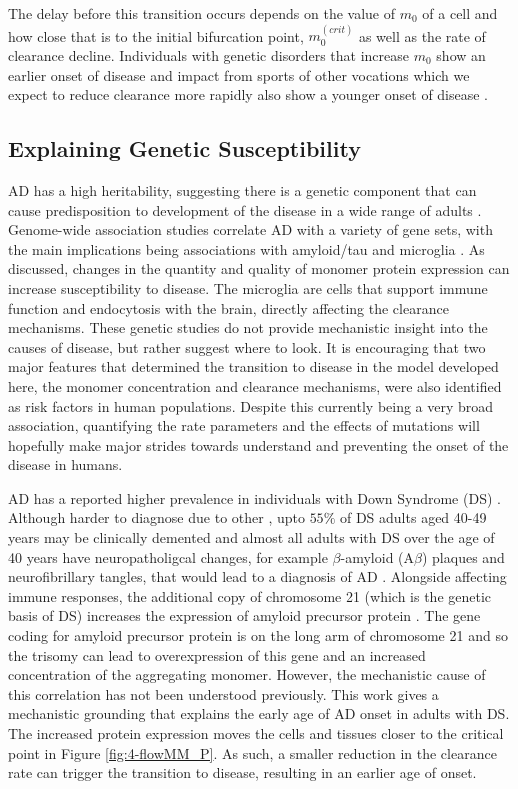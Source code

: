 The delay before this transition occurs depends on the value of $m_0$ of a cell and how close that is to the initial bifurcation point, $m_0^{(crit)}$ as well as the rate of clearance decline. Individuals with genetic disorders that increase $m_0$ show an earlier onset of disease  and impact from sports of other vocations which we expect to reduce clearance more rapidly also show a younger onset of disease .

\subsection{Explaining Genetic Susceptibility}

AD has a high heritability, suggesting there is a genetic component that can cause predisposition to development of the disease in a wide range of adults \cite{bellenguez_genetics_2020}. Genome-wide association studies correlate AD with a variety of gene sets, with the main implications being associations with amyloid/tau and microglia \cite{bellenguez_new_2022}. As discussed, changes in the quantity and quality of monomer protein expression can increase susceptibility to disease. The microglia are cells that support immune function and endocytosis with the brain, directly affecting the clearance mechanisms. These genetic studies do not provide mechanistic insight into the causes of disease, but rather suggest where to look. It is encouraging that two major features that determined the transition to disease in the model developed here, the monomer concentration and clearance mechanisms, were also identified as risk factors in human populations. Despite this currently being a very broad association, quantifying the rate parameters and the effects of mutations will hopefully make major strides towards understand and preventing the onset of the disease in humans.

AD has a reported higher prevalence in individuals with Down Syndrome (DS) \cite{head_aging_2012, zigman_alzheimers_2007}. Although harder to diagnose due to other , upto $55\%$ of DS adults aged 40-49 years may be clinically demented and almost all adults with DS over the age of 40 years have neuropatholigcal changes, for example $\beta$-amyloid (A$\beta$)  plaques and neurofibrillary tangles, that would lead to a diagnosis of AD \cite{zigman_alzheimers_2007}. Alongside affecting immune responses, the additional copy of chromosome 21 (which is the genetic basis of DS) increases the expression of amyloid precursor protein \cite{head_aging_2012, rumble_amyloid_1989}. The gene coding for amyloid precursor protein is on the long arm of chromosome 21 and so the trisomy can lead to overexpression of this gene and an increased concentration of the aggregating monomer. However, the mechanistic cause of this correlation has not been understood previously. This work gives a mechanistic grounding that explains the early age of AD onset in adults with DS. The increased protein expression moves the cells and tissues closer to the critical point  in Figure \ref{fig:4-flowMM_P}. As such, a smaller reduction in the clearance rate can trigger the transition to disease, resulting in an earlier age of onset.


